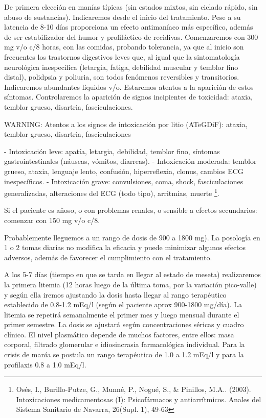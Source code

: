 \documentclass[encares.tex]{subfiles}
\begin{document}
De primera elección en manías típicas (sin estados mixtos, sin ciclado rápido, sin abuso de sustancias). Indicaremos desde el inicio del tratamiento. Pese a su latencia de 8-10 días proporciona un efecto antimaníaco más específico, además de ser estabilizador del humor y profiláctico de recidivas. Comenzaremos con 300 mg v/o c/8 horas, con las comidas, probando tolerancia, ya que al inicio son frecuentes los trastornos digestivos leves que, al igual que la sintomatología neurológica inespecífica (letargia, fatiga, debilidad muscular y temblor fino distal), polidpsia y poliuria, son todos fenómenos reversibles y transitorios. Indicaremos abundantes líquidos v/o. Estaremos atentos a la aparición de estos síntomas. Controlaremos la aparición de signos incipientes de toxicidad: ataxia, temblor grueso, disartria, fasciculaciones.

WARNING: Atentos a los signos de intoxicación por litio (ATeGDiF): ataxia, temblor grueso, disartria, fasciculaciones

- Intoxicación leve: apatía, letargia, debilidad, temblor fino, síntomas gastrointestinales (náuseas, vómitos, diarreas).
- Intoxicación moderada: temblor grueso, ataxia, lenguaje lento, confusión, hiperreflexia, clonus, cambios ECG inespecíficos.
- Intoxicación grave: convulsiones, coma, shock, fasciculaciones generalizadas, alteraciones del ECG (todo tipo), arritmias, muerte \footnote{Osés, I., Burillo-Putze, G., Munné, P., Nogué, S., \& Pinillos, M.A.. (2003). Intoxicaciones medicamentosas (I): Psicofármacos y antiarrítmicos. Anales del Sistema Sanitario de Navarra, 26(Supl. 1), 49-63}.

Si el paciente es añoso, o con problemas renales, o sensible a efectos secundarios: comenzar con 150 mg v/o c/8.

Probablemente lleguemos a un rango de dosis de 900 a 1800 mg). La posología en 1 o 2 tomas diarias no modifica la eficacia y puede minimizar algunos efectos adversos, además de favorecer el cumplimiento con el tratamiento.

A los 5-7 días (tiempo en que se tarda en llegar al estado de meseta) realizaremos la primera litemia (12 horas luego de la última toma, por la variación pico-valle) y según ella iremos ajustando la dosis hasta llegar al rango terapéutico establecido de 0.8-1.2 mEq/l (según el paciente aprox 900-1800 mg/día). La litemia se repetirá semanalmente el primer mes y luego mensual durante el primer semestre. La dosis se ajustará según concentraciones séricas y cuadro clínico. El nivel plasmático depende de muchos factores, entre ellos: masa corporal, filtrado glomerular e idiosincrasia farmacológica individual. Para la crisis de manía se postula un rango terapéutico de 1.0 a 1.2 mEq/l y para la profilaxis 0.8 a 1.0 mEq/l.
\end{document}
